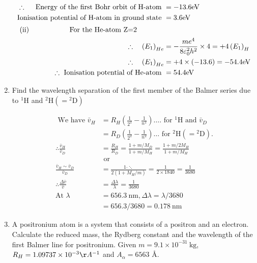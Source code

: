 \begin{enumerate}[ label=\color{ocre}\textbf{\arabic*.}]
\begin{answer}
\begin{align*}
 \therefore \quad\text{ Energy of the first Bohr orbit of H-atom }&=-13.6\mathrm{eV}\\
 \text{Ionisation potential of H-atom in ground state }&=3.6\mathrm{eV}\\
 \intertext{ \text(ii)\hspace{2cm}For the $\mathrm{He}$-atom $\mathrm{Z}$=2}
 \therefore \quad\left(E_{1}\right)_{H e}&=-\frac{m e^{4}}{8 \varepsilon_{0}^{2} h^{2}} \times 4=+4\left(E_{1}\right)_{H}\\
 \therefore \quad\left(E_{1}\right)_{H e}&=+4 \times(-13.6)=-54.4 \mathrm{eV}\\
 \therefore \text{ Ionisation potential of He-atom }&=54.4 \mathrm{eV}
 	\end{align*}
 \end{answer}
\item  Find the wavelength separation of the first member of the Balmer series due to ${ }^{1} \mathrm{H}$ and ${ }^{2} \mathrm{H}\left(={ }^{2} \mathrm{D}\right)$
\begin{answer}
	\begin{align*}
\text{	We have }\bar{v}_{H}&=R_{H}\left(\frac{1}{2^{2}}-\frac{1}{n^{2}}\right) \ldots . \text{ for } { }^{1} \mathrm{H}\text{ and }\bar{v}_{D}\\&=R_{D} \left(\frac{1}{2^{2}}-\frac{1}{n^{2}}\right) \ldots\text{ for }{ }^{2} \mathrm{H}\left(={ }^{2} \mathrm{D}\right).\\
\therefore \frac{\bar{v}_{H}}{\bar{v}_{D}}&=\frac{R_{H}}{R_{D}}=\frac{1+m / M_{D}}{1+m / M_{H}}=\frac{1+m / 2 M_{H}}{1+m / M_{H}}\\&\text{ or }\\\frac{\bar{v}_{H} \sim \bar{v}_{D}}{\bar{v}_{D}}&=\frac{1 \cdot \ddots}{2\left(1+M_{H} / m\right)}=\frac{1}{2 \times 1840}=\frac{1}{3680}\\
\therefore \frac{\Delta \bar{v}}{\bar{v}}&=\frac{\Delta \lambda}{\lambda}=\frac{1}{3680}\\
\text{At }\lambda&=656.3 \mathrm{~nm}, \Delta \lambda=\lambda / 3680\\&=656.3 / 3680=0.178 \mathrm{~nm}
	\end{align*}
\end{answer}
\item  A positronium atom is a system that consists of a positron and an electron. Calculate the reduced mass, the Rydberg constant and the wavelength of the first Balmer line for positronium. Given $m=9.1 \times 10^{-31} \mathrm{~kg}$,\\
$R_{H}=1.09737 \times 10^{-3} \AA^{-1}$ and $A_{\alpha}=6563$ \AA.

\end{enumerate}
